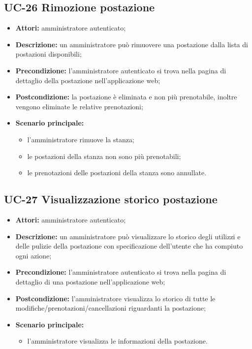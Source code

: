 \subsection{UC-26 Rimozione postazione}
\begin{itemize}
    \item \textbf{Attori:} amministratore autenticato;
    \item \textbf{Descrizione:} un amministratore pu\`{o} rimuovere una postazione dalla lista di postazioni disponibili;
    \item \textbf{Precondizione:} l'amministratore autenticato si trova nella pagina di dettaglio della postazione nell'applicazione web;
    \item \textbf{Postcondizione:} la postazione \`{e} eliminata e non più prenotabile, inoltre vengono eliminate le relative prenotazioni;
    \item \textbf{Scenario principale:}
    \begin{itemize}
        \item l'amministratore rimuove la stanza;
        \item le postazioni della stanza non sono pi\`{u} prenotabili;
        \item le prenotazioni delle postazioni della stanza sono annullate.
    \end{itemize}
\end{itemize}


\subsection{UC-27 Visualizzazione storico postazione}
\begin{itemize}
    \item \textbf{Attori:} amministratore autenticato;
    \item \textbf{Descrizione:} un amministratore pu\`{o} visualizzare lo storico degli utilizzi e delle pulizie della postazione con specificazione dell'utente che ha compiuto ogni azione;
    \item \textbf{Precondizione:} l'amministratore autenticato si trova nella pagina di dettaglio di una postazione nell'applicazione web;
    \item \textbf{Postcondizione:} l'amministratore visualizza lo storico di tutte le modifiche/prenotazioni/cancellazioni riguardanti la postazione;
    \item \textbf{Scenario principale:}
    \begin{itemize}
        \item l'amministratore visualizza le informazioni della postazione.
    \end{itemize}
\end{itemize}



